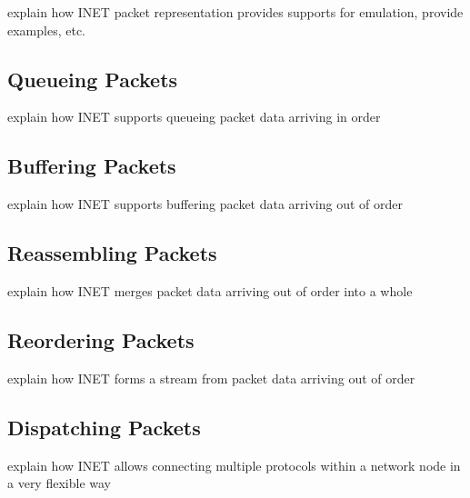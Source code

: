 explain how INET packet representation provides supports for emulation, provide examples, etc.



\subsection{Queueing Packets}

explain how INET supports queueing packet data arriving in order



\subsection{Buffering Packets}

explain how INET supports buffering packet data arriving out of order

\subsection{Reassembling Packets}

explain how INET merges packet data arriving out of order into a whole


\subsection{Reordering Packets}

explain how INET forms a stream from packet data arriving out of order


\subsection{Dispatching Packets}

explain how INET allows connecting multiple protocols within a network node in a very flexible way




